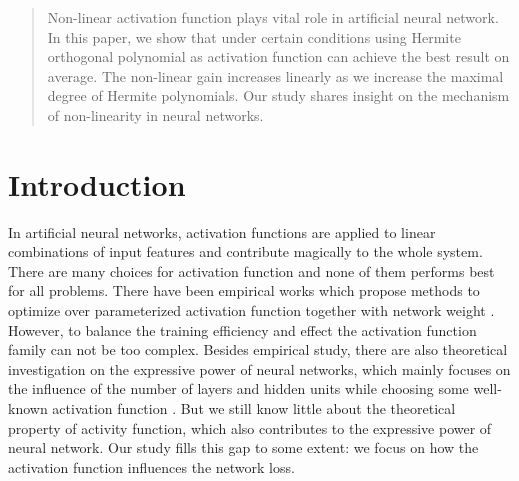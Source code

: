 \documentclass[conference]{IEEEtran}
\begin{document}
\begin{abstract}
Non-linear activation function plays vital role in artificial neural network.
In this paper, we show that under certain conditions using Hermite orthogonal polynomial as activation function
can achieve the best result on average. The non-linear gain increases linearly as we increase the maximal degree of Hermite polynomials. Our study shares insight on the mechanism of non-linearity in neural networks.
\end{abstract}



\section{Introduction}
In artificial neural networks, activation functions are applied to linear combinations of input features and contribute magically to the whole system.
There are many choices for activation function and none of them performs best for all problems. There have been empirical works which propose methods  to optimize over parameterized activation function together with network weight \cite{ramachandran2017searching}.
However, to balance the training efficiency and effect the activation function family can not be too complex\cite{laudani2015training}.
Besides empirical study, there are also theoretical investigation on the expressive power of neural networks, which mainly focuses on the influence of the number of layers and hidden units while choosing some well-known activation function \cite{AroraBMM18}. But we still know little about the theoretical property of activity function, which also contributes to the expressive power of neural network. Our study fills this gap to some extent: we focus on how the activation function influences the network loss.
\end{document}
